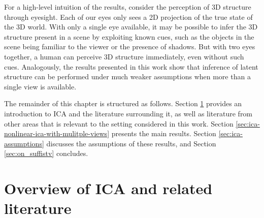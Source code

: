 For a high-level intuition of the results, consider the perception of 3D structure through eyesight.
Each of our eyes only sees a 2D projection of the true state of the 3D world.
With only a single eye available, it may be possible to infer the 3D structure present in a scene by exploiting known cues, such as the objects in the scene being familiar to the viewer or the presence of shadows.
But with two eyes together, a human can perceive 3D structure immediately, even without such cues. 
Analogously, the results presented in this work show that inference of latent structure can be performed under much weaker assumptions when more than a single view is available.


The remainder of this chapter is structured as follows.
Section \ref{sec:ica-literature-overview} provides an introduction to ICA and the literature surrounding it, as well as literature from other areas that is relevant to the setting considered in this work.
Section \ref{sec:ica-nonlinear-ica-with-mulitple-views} presents the main results.
Section \ref{sec:ica-assumptions} discusses the assumptions of these results, and Section \ref{sec:on_suffistv} concludes.




\section{Overview of ICA and related literature}\label{sec:ica-literature-overview}

